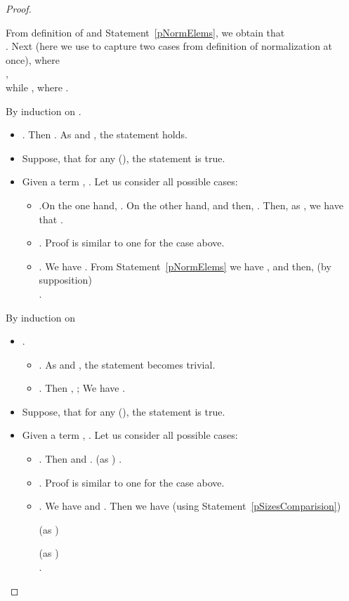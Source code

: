 \begin{lemma}
{\begin{proof}
\begin{description}
\begin{itemize}
	  \end{itemize} 
  \item [Statement~\ref{pPairingOfPairing}:] 
	From definition of   and Statement~\ref{pNormElems}, we obtain that \\ . 
	Next  (here we use  to capture two cases from definition of normalization at once), where  \\
	, \\
	while  , where . 
  \item [Statement~\ref{pNormSub}:]
      By induction on .
      \begin{itemize}
	\item . 
	      Then . As  and , the statement holds.
	\item Suppose, that for any  (), the statement is true.
	\item Given a term  , . Let us consider all possible cases:
	      \begin{itemize}
		\item .On the one hand, .  
		      On the other hand,  and then,
		      .
		      Then, as , we have that 
		      .
		\item . Proof is similar to one for the case above.
		\item . We have .
		      From Statement~\ref{pNormElems} we have ,
		      and then,  \br \br (by supposition) \\
		       \br.
	      \end{itemize} 
      \end{itemize}      
  \item [Statement~\ref{pSepVar}:]
      By induction on 
      \begin{itemize}
	\item  . 
	      \begin{itemize}
	      \item . As  and , the statement becomes trivial.
	      \item . Then , ; 
		    We have .
	      \end{itemize}
	\item Suppose, that for any  (), the statement is true.
	\item Given a term  , . Let us consider all possible cases:
	      \begin{itemize}
		\item . Then 
		       and .
		       \br  (as )
		      .
		\item . Proof is similar to one for the case above.
		\item . We have  and .
		      Then we have  (using Statement~\ref{pSizesComparision})
		      
		      (as )
		      
		      (as ) \\
		       \br . 
	      \end{itemize}
      \end{itemize}
 \end{description}
\end{proof}
} \end{lemma}

